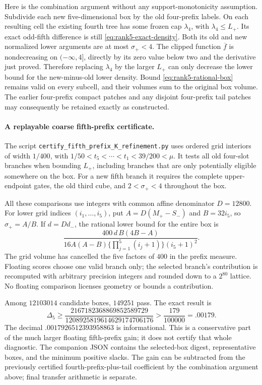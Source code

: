 \documentclass[11pt]{article}
\begin{document}
Here is the combination argument without any support-monotonicity
assumption. Subdivide each new five-dimensional box by the old
four-prefix labels. On each resulting cell the existing fourth
tree has some frozen cap $\lambda_4$, with $\lambda_4\le L_+$.
Its exact odd-fifth difference is still
\eqref{eq:rank5-exact-density}. Both its old and new normalized
lower arguments are at most $\sigma_+<4$. The clipped function
$\overline f$ is nondecreasing on $(-\infty,4]$, directly by its
zero value below two and the derivative just proved. Therefore
replacing $\lambda_4$ by the larger $L_+$ can only decrease the
lower bound for the new-minus-old lower density. Bound
\eqref{eq:rank5-rational-box} remains valid on every subcell, and
their volumes sum to the original box volume. The earlier
four-prefix compact patches and any disjoint four-prefix tail
patches may consequently be retained exactly as constructed.

\paragraph{A replayable coarse fifth-prefix certificate.}
The script \texttt{certify\_fifth\_prefix\_K\_refinement.py} uses
ordered grid interiors of width $1/400$, with
$1/50<t_5<\cdots<t_1<39/200<\mu$. It tests all old four-slot
branches when bounding $L_+$, including branches that are only
potentially eligible somewhere on the box. For a new fifth branch
it requires the complete upper-endpoint gates, the old third
cube, and $2<\sigma_+<4$ throughout the box.

All these comparisons use integers with common affine denominator
$D=12800$. For lower grid indices $(i_1,\ldots,i_5)$, put
$A=D(M_+-S_-)$ and $B=32i_5$, so $\sigma_+=A/B$.
If $d=Dd_-$, the rational lower bound for the entire box is
\[
 \frac{400\,d\,B(4B-A)}
 {16A(A-B)\{\prod_{j=1}^5(i_j+1)\}(i_5+1)^2}.
\]
The grid volume has cancelled the five factors of $400$ in the
prefix measure. Floating scores choose one valid branch only;
the selected branch's contribution is recomputed with arbitrary
precision integers and rounded down to a $2^{80}$ lattice.
No floating comparison licenses geometry or bounds a contribution.

Among $12103014$ candidate boxes, $149251$ pass. The exact result is
\begin{equation}\label{eq:rank5-coarse-certificate}
 \Delta_5\ge
 \frac{2167182368869852589729}{1208925819614629174706176}
 >\frac{179}{100000}=.00179.
\end{equation}
The decimal $.0017926512393958863$ is informational. This is a
conservative part of the much larger floating fifth-prefix gain;
it does not certify that whole diagnostic. The companion JSON
contains the selected-box digest, representative boxes, and the
minimum positive slacks. The gain can be subtracted from the
previously certified fourth-prefix-plus-tail coefficient by the
combination argument above; final transfer arithmetic is separate.
\end{document}
